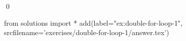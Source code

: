 
    \begin{ex}
  \label{ex:double-for-loop-1}
  
  \qed
\end{ex}
\begin{python0}
from solutions import *
add(label="ex:double-for-loop-1",
    srcfilename='exercises/double-for-loop-1/answer.tex') 
\end{python0}                              
